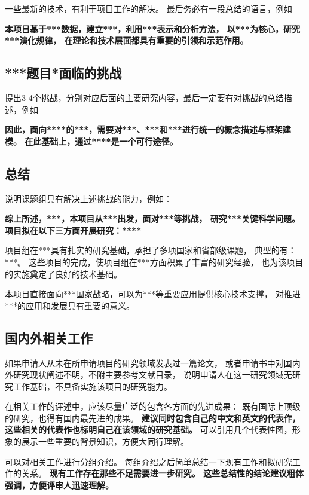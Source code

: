 \documentclass[12pt]{article}
\newcommand{\myEmph}[1]{\textbf{\textcolor[rgb]{0,0,0.25}{#1}}}
\begin{document}
一些最新的技术，有利于项目工作的解决。
最后务必有一段总结的语言，例如

\myEmph{本项目基于***数据，建立***，利用***表示和分析方法，
以***为核心，研究***演化规律，
在理论和技术层面都具有重要的引领和示范作用。}


\subsection{***题目*面临的挑战}

提出3-4个挑战，分别对应后面的主要研究内容，最后一定要有对挑战的总结描述，例如

\myEmph{因此，面向****的***，需要对***、***和***进行统一的概念描述与框架建模。
在此基础上，通过****是一个可行途径。}


\subsection{总结}

说明课题组具有解决上述挑战的能力，例如：

\myEmph{综上所述，***，本项目从***出发，面对***等挑战，
研究***关键科学问题。
项目拟在以下三方面开展研究：****}


项目组在***具有扎实的研究基础，承担了多项国家和省部级课题， 典型的有：***。
这些项目的完成，使项目组在***方面积累了丰富的研究经验，
也为该项目的实施奠定了良好的技术基础。

本项目直接面向***国家战略，可以为***等重要应用提供核心技术支撑，
对推进***的应用和发展具有重要的意义。

\subsection{国内外相关工作}

如果申请人从未在所申请项目的研究领域发表过一篇论文，
或者申请书中对国内外研究现状阐述不明，不附主要参考文献目录，
说明申请人在这一研究领域无研究工作基础，不具备实施该项目的研究能力。

在相关工作的评述中，应该尽量广泛的包含各方面的先进成果：
既有国际上顶级的研究，也得有国内最先进的成果。
\myEmph{建议同时包含自己的中文\cite{21SC_WebSegE}和英文\cite{ChengZMHH10}的代表作，
这些相关的代表作也标明自己在该领域的研究基础。}
可以引用几个代表性图，形象的展示一些重要的背景知识，方便大同行理解。

可以对相关工作进行分组介绍。
每组介绍之后简单总结一下现有工作和拟研究工作的关系。
\myEmph{现有工作存在那些不足需要进一步研究。
这些总结性的结论建议粗体强调，方便评审人迅速理解。}
\end{document}
